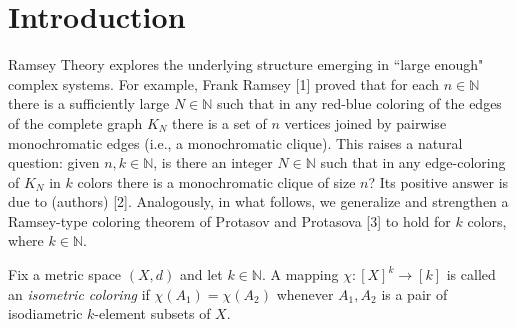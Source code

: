\section{Introduction}
Ramsey Theory explores the underlying structure emerging in ``large enough" complex systems. For example, Frank Ramsey [1] proved that for each \( n \in \mathbb{N}  \) there is a sufficiently large \( N \in \mathbb{N}  \) such that in any red-blue coloring of the edges of the complete graph \( K_{N} \) there is a set of \( n \) vertices joined by pairwise monochromatic edges (i.e., a monochromatic clique).  This raises a natural question: given \( n, k \in \mathbb{N}  \), is there an integer \( N \in \mathbb{N} \) such that in any edge-coloring of \( K_{N}  \) in \( k \) colors there is a monochromatic clique of size \( n \)? Its positive answer is due to (authors) [2]. Analogously, in what follows, we generalize and strengthen a Ramsey-type coloring theorem of Protasov and Protasova [3] to hold for $k$ colors, where \( k \in \mathbb{N}  \).

Fix a metric space \( (X,d) \) and let \( k \in \mathbb{N}  \). A mapping \( \chi : [X]^{k} \to [k]  \) is called an \emph{isometric coloring} if \( \chi (A_1) = \chi (A_2) \) whenever \( A_1, A_2 \) is a pair of isodiametric \( k \)-element subsets of \( X \).

